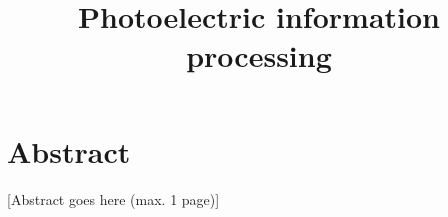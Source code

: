 \documentclass[a4paper, 12pt, UTF8]{article}
\title{Photoelectric information processing}
\begin{document}


\clearpage
\thispagestyle{empty}
\section*{Abstract}

[Abstract goes here (max. 1 page)]




\clearpage
{}
\tableofcontents
\clearpage
\listoffigures
\clearpage
\listoftables
\clearpage













\appendix
\renewcommand*{\thesection}{\Alph{section}}\textbf{}








\clearpage
\renewcommand*{\thesection}{}\textbf{}


\end{document}

